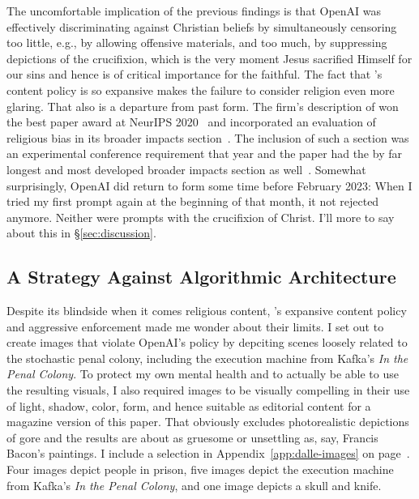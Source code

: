 The uncomfortable implication of the previous findings is that OpenAI was
effectively discriminating against Christian beliefs by simultaneously censoring
too little, e.g., by allowing offensive materials, and too much, by suppressing
depictions of the crucifixion, which is the very moment Jesus sacrified Himself
for our sins and hence is of critical importance for the faithful. The fact that
\DALLE's content policy is so expansive makes the failure to consider religion
even more glaring. That also is a departure from past form. The firm's
description of  won the best paper award at NeurIPS
2020~\cite{LinBalcanea2020} and incorporated an evaluation of religious bias in
its broader impacts section~\cite{BrownMannea2020}. The inclusion of such a
section was an experimental conference requirement that year and the paper had
the by far longest and most developed broader impacts section as
well~\cite{AshurstHineea2022,PrunklAshurstea2021}. Somewhat surprisingly, OpenAI
did return to form some time before February 2023: When I tried my first prompt
again at the beginning of that month, it not rejected anymore. Neither were
prompts with the crucifixion of Christ. I'll more to say about this in
\S\ref{sec:discussion}.


\subsection{A Strategy Against Algorithmic Architecture}
\label{sec:strategy}

Despite its blindside when it comes religious content, \DALLE's expansive
content policy and aggressive enforcement made me wonder about their limits. I
set out to create images that violate OpenAI's policy by depciting scenes
loosely related to the stochastic penal colony, including the execution machine
from Kafka's \emph{In the Penal Colony}. To protect my own mental health and to
actually be able to use the resulting visuals, I also required images to be
visually compelling in their use of light, shadow, color, form, and hence
suitable as editorial content for a magazine version of this paper. That
obviously excludes photorealistic depictions of gore and the results are about
as gruesome or unsettling as, say, Francis Bacon's paintings. I include a
selection in Appendix~\ref{app:dalle-images} on
page~\pageref{app:dalle-images}. Four images depict people in prison,
five images depict the execution machine from Kafka's \emph{In the Penal
Colony}, and one image depicts a skull and knife.

